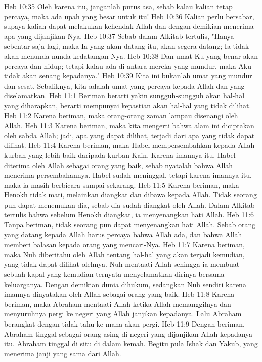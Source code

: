 Heb 10:35  Oleh karena itu, janganlah putus asa, sebab kalau kalian tetap percaya, maka ada upah yang besar untuk itu!
Heb 10:36  Kalian perlu bersabar, supaya kalian dapat melakukan kehendak Allah dan dengan demikian menerima apa yang dijanjikan-Nya.
Heb 10:37  Sebab dalam Alkitab tertulis, "Hanya sebentar saja lagi, maka Ia yang akan datang itu, akan segera datang; Ia tidak akan menunda-nunda kedatangan-Nya.
Heb 10:38  Dan umat-Ku yang benar akan percaya dan hidup; tetapi kalau ada di antara mereka yang mundur, maka Aku tidak akan senang kepadanya."
Heb 10:39  Kita ini bukanlah umat yang mundur dan sesat. Sebaliknya, kita adalah umat yang percaya kepada Allah dan yang diselamatkan.
Heb 11:1  Beriman berarti yakin sungguh-sungguh akan hal-hal yang diharapkan, berarti mempunyai kepastian akan hal-hal yang tidak dilihat.
Heb 11:2  Karena beriman, maka orang-orang zaman lampau disenangi oleh Allah.
Heb 11:3  Karena beriman, maka kita mengerti bahwa alam ini diciptakan oleh sabda Allah; jadi, apa yang dapat dilihat, terjadi dari apa yang tidak dapat dilihat.
Heb 11:4  Karena beriman, maka Habel mempersembahkan kepada Allah kurban yang lebih baik daripada kurban Kain. Karena imannya itu, Habel diterima oleh Allah sebagai orang yang baik, sebab nyatalah bahwa Allah menerima persembahannya. Habel sudah meninggal, tetapi karena imannya itu, maka ia masih berbicara sampai sekarang.
Heb 11:5  Karena beriman, maka Henokh tidak mati, melainkan diangkat dan dibawa kepada Allah. Tidak seorang pun dapat menemukan dia, sebab dia sudah diangkat oleh Allah. Dalam Alkitab tertulis bahwa sebelum Henokh diangkat, ia menyenangkan hati Allah.
Heb 11:6  Tanpa beriman, tidak seorang pun dapat menyenangkan hati Allah. Sebab orang yang datang kepada Allah harus percaya bahwa Allah ada, dan bahwa Allah memberi balasan kepada orang yang mencari-Nya.
Heb 11:7  Karena beriman, maka Nuh diberitahu oleh Allah tentang hal-hal yang akan terjadi kemudian, yang tidak dapat dilihat olehnya. Nuh mentaati Allah sehingga ia membuat sebuah kapal yang kemudian ternyata menyelamatkan dirinya bersama keluarganya. Dengan demikian dunia dihukum, sedangkan Nuh sendiri karena imannya dinyatakan oleh Allah sebagai orang yang baik.
Heb 11:8  Karena beriman, maka Abraham mentaati Allah ketika Allah memanggilnya dan menyuruhnya pergi ke negeri yang Allah janjikan kepadanya. Lalu Abraham berangkat dengan tidak tahu ke mana akan pergi.
Heb 11:9  Dengan beriman, Abraham tinggal sebagai orang asing di negeri yang dijanjikan Allah kepadanya itu. Abraham tinggal di situ di dalam kemah. Begitu pula Ishak dan Yakub, yang menerima janji yang sama dari Allah.
